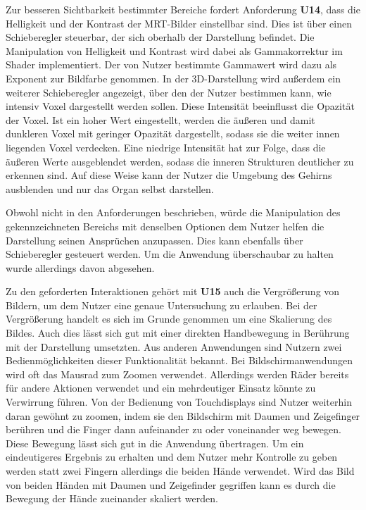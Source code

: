 Zur besseren Sichtbarkeit bestimmter Bereiche fordert Anforderung \textbf{U14}, dass die Helligkeit und der Kontrast der MRT-Bilder einstellbar sind. Dies ist über einen Schieberegler steuerbar, der sich oberhalb der Darstellung befindet. 
Die Manipulation von Helligkeit und Kontrast wird dabei als Gammakorrektur im Shader implementiert. Der von Nutzer bestimmte Gammawert wird dazu als Exponent zur Bildfarbe genommen. 
In der 3D-Darstellung wird außerdem ein weiterer Schieberegler angezeigt, über den der Nutzer bestimmen kann, wie intensiv Voxel dargestellt werden sollen. Diese Intensität beeinflusst die Opazität der Voxel. Ist ein hoher Wert eingestellt, werden die äußeren und damit dunkleren Voxel mit geringer Opazität dargestellt, sodass sie die weiter innen liegenden Voxel verdecken. Eine niedrige Intensität hat zur Folge, dass die äußeren Werte ausgeblendet werden, sodass die inneren Strukturen deutlicher zu erkennen sind. Auf diese Weise kann der Nutzer die Umgebung des Gehirns ausblenden und nur das Organ selbst darstellen.

Obwohl nicht in den Anforderungen beschrieben, würde die Manipulation des gekennzeichneten Bereichs mit denselben Optionen dem Nutzer helfen die Darstellung seinen Ansprüchen anzupassen. Dies kann ebenfalls über Schieberegler gesteuert werden. Um die Anwendung überschaubar zu halten wurde allerdings davon abgesehen.

Zu den geforderten Interaktionen gehört mit \textbf{U15} auch die Vergrößerung von Bildern, um dem Nutzer eine genaue Untersuchung zu erlauben. Bei der Vergrößerung handelt es sich im Grunde genommen um eine Skalierung des Bildes. Auch dies lässt sich gut mit einer direkten Handbewegung in Berührung mit der Darstellung umsetzten. Aus anderen Anwendungen sind Nutzern zwei Bedienmöglichkeiten dieser Funktionalität bekannt. Bei Bildschirmanwendungen wird oft das Mausrad zum Zoomen verwendet. Allerdings werden Räder bereits für andere Aktionen verwendet und ein mehrdeutiger Einsatz könnte zu Verwirrung führen. Von der Bedienung von Touchdisplays sind Nutzer weiterhin daran gewöhnt zu zoomen, indem sie den Bildschirm mit Daumen und Zeigefinger berühren und die Finger dann aufeinander zu oder voneinander weg bewegen. Diese Bewegung lässt sich gut in die Anwendung übertragen. Um ein eindeutigeres Ergebnis zu erhalten und dem Nutzer mehr Kontrolle zu geben werden statt zwei Fingern allerdings die beiden Hände verwendet. Wird das Bild von beiden Händen mit Daumen und Zeigefinder gegriffen kann es durch die Bewegung der Hände zueinander skaliert werden.

